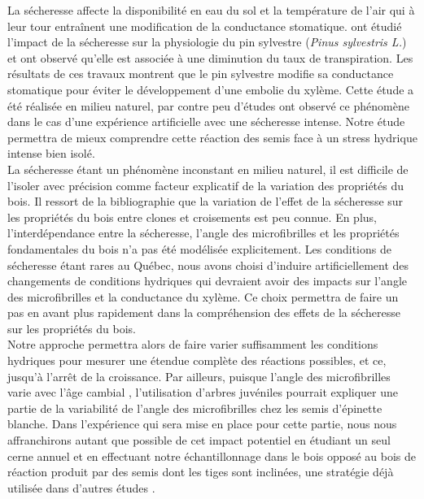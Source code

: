 \documentclass[a4paper,12pt]{report}
\begin{document}
\begin{itemize}
	La sécheresse affecte la disponibilité en eau du sol et la température de l'air qui à leur tour entraînent une modification de la conductance stomatique. \cite{Irvine1997} ont étudié l'impact de la sécheresse sur la physiologie du pin sylvestre (\textit{Pinus sylvestris L.})%
	et ont observé qu'elle est associée à une diminution du taux de transpiration. Les résultats de ces travaux montrent que le pin sylvestre modifie sa conductance stomatique pour éviter le développement d'une embolie du xylème. Cette étude a été réalisée en milieu naturel, par contre peu d'études ont observé ce phénomène dans le cas d'une expérience artificielle avec une sécheresse intense. Notre étude permettra de mieux comprendre cette réaction des semis face à un stress hydrique intense bien isolé.\\
	
	 La sécheresse étant un phénomène inconstant en milieu naturel, il est difficile de l'isoler avec précision comme facteur explicatif de la variation des propriétés du bois. Il ressort de la bibliographie que la variation de l'effet de la sécheresse sur les propriétés du bois entre clones et croisements est peu connue. En plus, l'interdépendance entre la sécheresse, l'angle des microfibrilles et les propriétés fondamentales du bois n'a pas été modélisée explicitement. Les conditions de sécheresse étant rares au Québec, nous avons choisi d'induire artificiellement des changements de conditions hydriques qui devraient avoir des impacts sur l'angle des microfibrilles et la conductance du xylème. Ce choix permettra de faire un pas en avant plus rapidement dans la compréhension des effets de la sécheresse sur les propriétés du bois.\\
		
	Notre approche permettra alors de faire varier suffisamment les conditions hydriques pour mesurer une étendue complète des réactions possibles, et ce, jusqu'à l'arrêt de la croissance. Par ailleurs, puisque l'angle des microfibrilles varie avec l'âge cambial \citep{Lindstrom1998}, l'utilisation d'arbres juvéniles pourrait expliquer une partie de la variabilité de l'angle des microfibrilles chez les semis d'épinette blanche. Dans l'expérience qui sera mise en place pour cette partie, nous nous affranchirons autant que possible de cet impact potentiel en étudiant un seul cerne annuel et en effectuant notre échantillonnage dans le bois opposé au bois de réaction produit par des semis dont les tiges sont inclinées, une stratégie déjà utilisée dans d'autres études \citep{Apiolaza2011}.\\  
	

\end{itemize}
\end{document}
